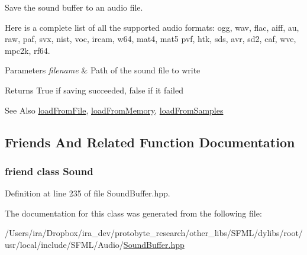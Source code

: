 Save the sound buffer to an audio file. 

Here is a complete list of all the supported audio formats\-: ogg, wav, flac, aiff, au, raw, paf, svx, nist, voc, ircam, w64, mat4, mat5 pvf, htk, sds, avr, sd2, caf, wve, mpc2k, rf64.


\begin{DoxyParams}{Parameters}
{\em filename} & Path of the sound file to write\\
\hline
\end{DoxyParams}
\begin{DoxyReturn}{Returns}
True if saving succeeded, false if it failed
\end{DoxyReturn}
\begin{DoxySeeAlso}{See Also}
\hyperlink{classsf_1_1_sound_buffer_a2be6a8025c97eb622a7dff6cf2594394}{load\-From\-File}, \hyperlink{classsf_1_1_sound_buffer_af8cfa5599739a7edae69c5cba273d33f}{load\-From\-Memory}, \hyperlink{classsf_1_1_sound_buffer_a63da986e144b578135edd48e51c565e8}{load\-From\-Samples} 
\end{DoxySeeAlso}


\subsection{Friends And Related Function Documentation}
\hypertarget{classsf_1_1_sound_buffer_a50914f77c7cf4fb97616c898c5291f4b}{
\subsubsection[{Sound}]{\setlength{\rightskip}{0pt plus 5cm}friend class {\bf Sound}\hspace{0.3cm}{\ttfamily [friend]}}}\label{classsf_1_1_sound_buffer_a50914f77c7cf4fb97616c898c5291f4b}


Definition at line 235 of file Sound\-Buffer.\-hpp.



The documentation for this class was generated from the following file\-:\begin{DoxyCompactItemize}
\item 
/\-Users/ira/\-Dropbox/ira\-\_\-dev/protobyte\-\_\-research/other\-\_\-libs/\-S\-F\-M\-L/dylibs/root/usr/local/include/\-S\-F\-M\-L/\-Audio/\hyperlink{_sound_buffer_8hpp}{Sound\-Buffer.\-hpp}\end{DoxyCompactItemize}
